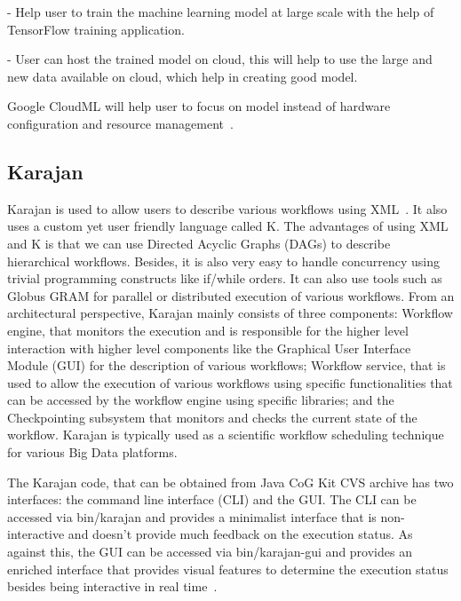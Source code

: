     - Help user to train the machine learning model at large scale
       with the help of TensorFlow  training application.
	
     - User can host the trained model on cloud,  this will help
       to use the large and new data available on cloud, which help in
       creating good model.

       Google CloudML will help user to focus on model instead of
       hardware configuration and resource
       management~\cite{www-googlecloudoverview}.

\subsection{Karajan}

Karajan is used to allow users to describe various workflows using
XML~\cite{RMBDP-Book-1}.  It also uses a custom yet user friendly
language called K.  The advantages of using XML and K is that we can
use Directed Acyclic Graphs (DAGs) to describe hierarchical workflows.
Besides, it is also very easy to handle concurrency using trivial
programming constructs like if/while orders.  It can also use tools
such as Globus GRAM for parallel or distributed execution of various
workflows.  From an architectural perspective, Karajan mainly consists
of three components: Workflow engine, that monitors the execution and
is responsible for the higher level interaction with higher level
components like the Graphical User Interface Module (GUI) for the
description of various workflows; Workflow service, that is used to
allow the execution of various workflows using specific
functionalities that can be accessed by the workflow engine using
specific libraries; and the Checkpointing subsystem that monitors and
checks the current state of the workflow.  Karajan is typically used
as a scientific workflow scheduling technique for various Big Data
platforms.

The Karajan code, that can be obtained from Java CoG Kit CVS archive
has two interfaces: the command line interface (CLI) and the GUI.  The
CLI can be accessed via bin/karajan and provides a minimalist
interface that is non-interactive and doesn't provide much feedback on
the execution status.  As against this, the GUI can be accessed via
bin/karajan-gui and provides an enriched interface that provides
visual features to determine the execution status besides being
interactive in real time~\cite{Karajan-interfaces}.


